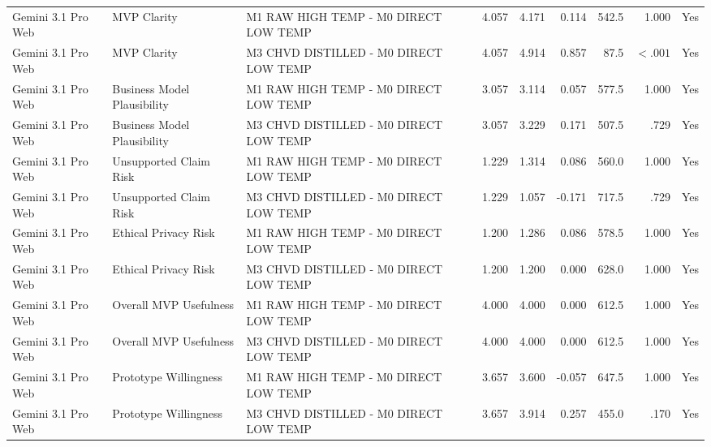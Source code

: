 \documentclass[10pt]{article}
\begin{document}
\begin{landscape}
\begin{longtable}{lllrrrrrr}
Gemini 3.1 Pro Web & MVP Clarity & M1 RAW HIGH TEMP - M0 DIRECT LOW TEMP & 4.057 & 4.171 & 0.114 & 542.5 & 1.000 & Yes \\
Gemini 3.1 Pro Web & MVP Clarity & M3 CHVD DISTILLED - M0 DIRECT LOW TEMP & 4.057 & 4.914 & 0.857 & 87.5 & $<.001$ & Yes \\
Gemini 3.1 Pro Web & Business Model Plausibility & M1 RAW HIGH TEMP - M0 DIRECT LOW TEMP & 3.057 & 3.114 & 0.057 & 577.5 & 1.000 & Yes \\
Gemini 3.1 Pro Web & Business Model Plausibility & M3 CHVD DISTILLED - M0 DIRECT LOW TEMP & 3.057 & 3.229 & 0.171 & 507.5 & .729 & Yes \\
Gemini 3.1 Pro Web & Unsupported Claim Risk & M1 RAW HIGH TEMP - M0 DIRECT LOW TEMP & 1.229 & 1.314 & 0.086 & 560.0 & 1.000 & Yes \\
Gemini 3.1 Pro Web & Unsupported Claim Risk & M3 CHVD DISTILLED - M0 DIRECT LOW TEMP & 1.229 & 1.057 & -0.171 & 717.5 & .729 & Yes \\
Gemini 3.1 Pro Web & Ethical Privacy Risk & M1 RAW HIGH TEMP - M0 DIRECT LOW TEMP & 1.200 & 1.286 & 0.086 & 578.5 & 1.000 & Yes \\
Gemini 3.1 Pro Web & Ethical Privacy Risk & M3 CHVD DISTILLED - M0 DIRECT LOW TEMP & 1.200 & 1.200 & 0.000 & 628.0 & 1.000 & Yes \\
Gemini 3.1 Pro Web & Overall MVP Usefulness & M1 RAW HIGH TEMP - M0 DIRECT LOW TEMP & 4.000 & 4.000 & 0.000 & 612.5 & 1.000 & Yes \\
Gemini 3.1 Pro Web & Overall MVP Usefulness & M3 CHVD DISTILLED - M0 DIRECT LOW TEMP & 4.000 & 4.000 & 0.000 & 612.5 & 1.000 & Yes \\
Gemini 3.1 Pro Web & Prototype Willingness & M1 RAW HIGH TEMP - M0 DIRECT LOW TEMP & 3.657 & 3.600 & -0.057 & 647.5 & 1.000 & Yes \\
Gemini 3.1 Pro Web & Prototype Willingness & M3 CHVD DISTILLED - M0 DIRECT LOW TEMP & 3.657 & 3.914 & 0.257 & 455.0 & .170 & Yes \\
\end{longtable}
\end{landscape}
\end{document}

